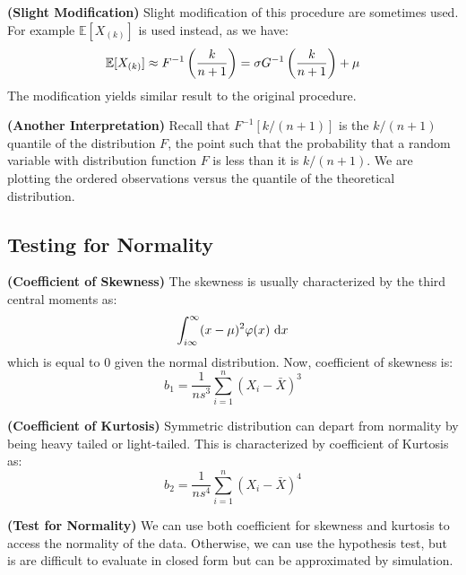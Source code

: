 \begin{remark}{\textbf{(Slight Modification)}}
    Slight modification of this procedure are sometimes used. For example $\mathbb{E}[X_{(k)}]$ is used instead, as we have:
    \begin{equation*}
        \mathbb{E}[X_{(k)}] \approx F^{-1}\left( \frac{k}{n+1} \right) = \sigma G^{-1}\left( \frac{k}{n+1} \right) + \mu
    \end{equation*}
    The modification yields similar result to the original procedure. 
\end{remark}

\begin{remark}{\textbf{(Another Interpretation)}}
    Recall that $F^{-1}[k/(n+1)]$ is the $k/(n+1)$ quantile of the distribution $F$, the point such that the probability that a random variable with distribution function $F$ is less than it is $k/(n+1)$. We are plotting the ordered observations versus the quantile of the theoretical distribution. 
\end{remark}

\subsection{Testing for Normality}

\begin{definition}{\textbf{(Coefficient of Skewness)}}
    The skewness is usually characterized by the third central moments as:
    \begin{equation*}
        \int^\infty_{i\infty}(x-\mu)^2\varphi(x)\ \mathrm{d} x
    \end{equation*}
    which is equal to $0$ given the normal distribution. Now, coefficient of skewness is:
    \begin{equation*}
        b_1 = \frac{1}{ns^3}\sum^n_{i=1}(X_i-\bar{X})^3
    \end{equation*}
\end{definition}

\begin{definition}{\textbf{(Coefficient of Kurtosis)}}
    Symmetric distribution can depart from normality by being heavy tailed or light-tailed. This is characterized by coefficient of Kurtosis as:
    \begin{equation*}
        b_2 = \frac{1}{ns^4}\sum^n_{i=1}(X_i-\bar{X})^4
    \end{equation*}
\end{definition}

\begin{remark}{\textbf{(Test for Normality)}}
    We can use both coefficient for skewness and kurtosis to access the normality of the data. Otherwise, we can use the hypothesis test, but is are difficult to evaluate in closed form but can be approximated by simulation.
\end{remark}


